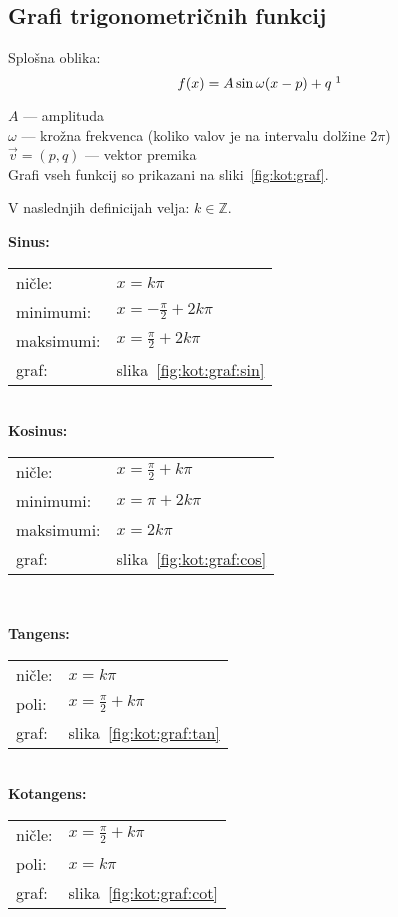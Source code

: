 \documentclass[a4paper,oneside,12pt,fleqn]{article}
\def\Z{\ensuremath{\mathbb Z}}
\numberwithin{equation}{section}
\begin{document}
\subsection{Grafi trigonometričnih funkcij}
\label{sec:kot:graf}
Splošna oblika:
\[ f(x) = A\sin\omega(x-p)+q \; \footnotemark \]

$A$ --- amplituda \\
$\omega$ --- krožna frekvenca (koliko valov je na intervalu dolžine $2\pi$) \\
$\vec{v} = (p,q)$ --- vektor premika \\
Grafi vseh funkcij so prikazani na sliki~\ref{fig:kot:graf}.

V naslednjih definicijah velja: $k \in \Z$.

\parbox[t]{0.5\textwidth}{
\textbf{Sinus:} \\[6pt]
\begin{tabular}[h!]{ll}
  ničle:    & $x = k\pi$ \\
  minimumi: & $x = -\frac{\pi}{2} + 2k\pi$ \\
  maksimumi:& $x = \frac{\pi}{2} + 2k\pi$ \\
  graf:     & slika~\ref{fig:kot:graf:sin}
\end{tabular} \\[12pt]
\textbf{Kosinus:}\\[6pt]
\begin{tabular}[h!]{ll}
  ničle:    & $x = \frac{\pi}{2} + k\pi$ \\
  minimumi: & $x = \pi + 2k\pi$ \\
  maksimumi:& $x = 2k\pi$ \\
  graf:     & slika~\ref{fig:kot:graf:cos}
\end{tabular} \\[12pt]
}
\parbox[t]{0.5\textwidth}{
\textbf{Tangens:} \\[6pt]
\begin{tabular}[h!]{ll}
  ničle: & $x = k\pi$ \\
  poli:  & $x = \frac{\pi}{2} + k\pi$ \\
  graf:     & slika~\ref{fig:kot:graf:tan}
\end{tabular} \\[24pt]
\textbf{Kotangens:} \\[6pt]
\begin{tabular}[h!]{ll}
  ničle:  & $x = \frac{\pi}{2} + k\pi$ \\
  poli: & $x = k\pi$ \\
  graf:     & slika~\ref{fig:kot:graf:cot}
\end{tabular} \\[12pt]
}
\end{document}

